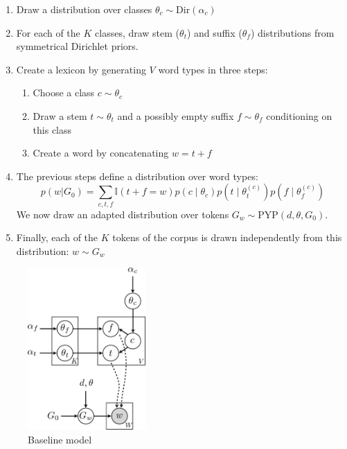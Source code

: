 \documentclass{article}
\begin{document}
\begin{enumerate}
    \item Draw a distribution over classes $\theta_c \sim \text{Dir}(\alpha_c)$
    \item For each of the $K$ classes, draw stem ($\theta_t$) and suffix ($\theta_f$) distributions from symmetrical Dirichlet priors.
    \item Create a lexicon by generating $V$ word types in three steps:
        \begin{enumerate}
            \item Choose a class $c \sim \theta_c$
            \item Draw a stem $t \sim \theta_t$ and a possibly empty suffix $f \sim \theta_f$ conditioning on this class
            \item Create a word by concatenating $w = t+f$
        \end{enumerate}
    \item The previous steps define a distribution over word types:
        $$p(w|G_0) = \sum_{c,t,f} \mathbb{I}(t+f = w) p(c \mid \theta_c) p(t \mid \theta_t^{(c)}) p(f \mid \theta_f^{(c)})$$
        We now draw an adapted distribution over tokens $G_w \sim \text{PYP}(d, \theta, G_0)$.
    \item Finally, each of the $K$ tokens of the corpus is drawn independently from this distribution: $w \sim G_w$
\end{enumerate}

\begin{figure}[h]
\centering
\includegraphics[width=0.4\textwidth]{fig/graph-model}
\caption{Baseline model}
\label{fig:graph-model}
\end{figure}
\end{document}
